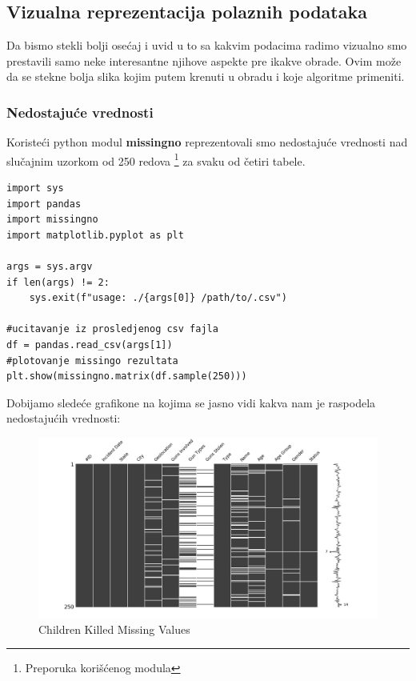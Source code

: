 \documentclass[12pt, a4paper]{article}
\begin{document}
\break
 

\subsection {Vizualna reprezentacija polaznih podataka}
Da bismo stekli bolji ose\' caj i uvid u to sa kakvim podacima radimo vizualno smo prestavili samo neke interesantne njihove aspekte pre ikakve obrade. Ovim mo\v ze da se stekne bolja slika kojim putem krenuti u obradu i koje algoritme primeniti.

\subsubsection{Nedostaju\' ce vrednosti}
Koriste\' ci python modul \textbf{missingno} reprezentovali smo nedostaju\' ce vrednosti nad slu\v cajnim uzorkom od 250 redova \footnote{Preporuka kori\v s\' cenog modula} za svaku od \v cetiri tabele.

\begin{lstlisting}
import sys
import pandas
import missingno
import matplotlib.pyplot as plt

args = sys.argv
if len(args) != 2:
    sys.exit(f"usage: ./{args[0]} /path/to/.csv")

#ucitavanje iz prosledjenog csv fajla
df = pandas.read_csv(args[1])
#plotovanje missingo rezultata
plt.show(missingno.matrix(df.sample(250)))
\end{lstlisting}

Dobijamo slede\' ce grafikone na kojima se jasno vidi kakva nam je raspodela nedostaju\' cih vrednosti:

\begin{figure}[H]
\includegraphics[width=\textwidth]
{missing_children_killed.png}
\caption{Children Killed Missing Values}
\end{figure}
\end{document}
